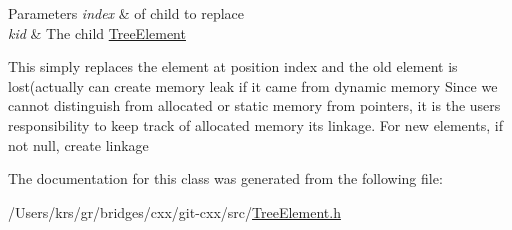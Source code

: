 \begin{DoxyParams}{Parameters}
{\em index} & of child to replace \\
\hline
{\em kid} & The child \hyperlink{classbridges_1_1_tree_element}{Tree\+Element} \\
\hline
\end{DoxyParams}
This simply replaces the element at position index and the old element is lost(actually can create memory leak if it came from dynamic memory Since we cannot distinguish from allocated or static memory from pointers, it is the user\textquotesingle{}s responsibility to keep track of allocated memory its linkage. For new elements, if not null, create linkage

The documentation for this class was generated from the following file\+:\begin{DoxyCompactItemize}
\item 
/\+Users/krs/gr/bridges/cxx/git-\/cxx/src/\hyperlink{_tree_element_8h}{Tree\+Element.\+h}\end{DoxyCompactItemize}
